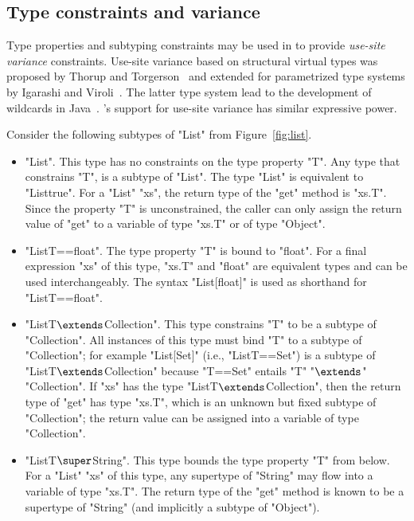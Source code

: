 
\subsection{Type constraints and variance}
\label{sec:variance}

Type properties and subtyping constraints may be used in \Xten{} to 
provide \emph{use-site variance}
constraints.
Use-site variance based on structural virtual types was proposed by
Thorup and Torgerson~\cite{unifying-genericity} and extended for
parametrized type systems by Igarashi and
Viroli~\cite{variant-parametric-types}.  The latter type system lead
to the development of wildcards in
Java~\cite{Java3,adding-wildcards,wildcards-safe}.  \Xten's
support for use-site variance
has similar expressive power.

Consider the following subtypes  of \xcd"List" from
Figure~\ref{fig:list}.
\begin{itemize}
\item \xcd"List".  This type has no constraints on the type
property \xcd"T".
Any type that constrains \xcd"T",
is a subtype of \xcd"List".  The type \xcd"List" is equivalent to
\xcd"List{true}".
%
For a \xcd"List" \xcd"xs", the return type of the \xcd"get" method
is \xcd"xs.T".
Since the property \xcd"T" is unconstrained,
the caller can only assign the return value of \xcd"get"
to a variable of type \xcd"xs.T" or of type \xcd"Object".

\item \xcd"List{T==float}".
The type property \xcd"T" is bound to \xcd"float".
For a final expression \xcd"xs" of this type,
\xcd"xs.T" and \xcd"float" are equivalent types and can be used
interchangeably.
The syntax \xcd"List[float]" is used as
shorthand for \xcd"List{T==float}".

\item \xcdmath"List{T$\extends$Collection}".
This type constrains \xcd"T" to be a subtype of \xcd"Collection".
All instances of this type must bind \xcd"T" to a subtype of
\xcd"Collection"; for example \xcd"List[Set]" (i.e.,
\xcd"List{T==Set}") is a subtype of
\xcdmath"List{T$\extends$Collection}" because \xcd"T==Set" entails
\xcdmath"T"
\xcdmath"$\extends$"
\xcdmath"Collection".
%
If \xcd"xs" has the type \xcdmath"List{T$\extends$Collection}",
then the return type of \xcd"get" has type \xcd"xs.T", which is an unknown but
fixed subtype of \xcd"Collection"; the return value can be
assigned into a variable of type \xcd"Collection".

\item \xcdmath"List{T$\super$String}".  This type bounds the type property
\xcd"T"
from below.  For a \xcd"List" \xcd"xs" of this type, any
supertype of \xcd"String" may flow into a variable of type \xcd"xs.T".
The return type of the \xcd"get"
method is known to be a
supertype of \xcd"String" (and implicitly a subtype of \xcd"Object").
\end{itemize}

